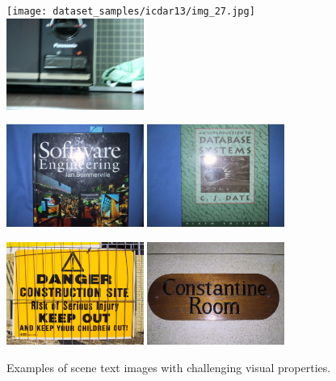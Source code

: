 \begin{figure}[!ht]
    \centering
    \texttt{[image: dataset\_samples/icdar13/img\_27.jpg]}
    \includegraphics[width=0.40\textwidth]{dataset_samples/icdar13/img_169.jpg}
    
    \vspace{1.5mm}
    
    \includegraphics[width=0.40\textwidth]{dataset_samples/icdar13/img_37.jpg}
    \includegraphics[width=0.40\textwidth]{dataset_samples/icdar13/img_40.jpg}
    
    \vspace{1.5mm}
    
    \includegraphics[width=0.40\textwidth]{dataset_samples/icdar13/img_107.jpg}
    \includegraphics[width=0.40\textwidth]{dataset_samples/icdar13/img_207.jpg}
    \caption{Examples of scene text images with challenging visual properties.}
    \label{fig:problematic_images}
\end{figure}

